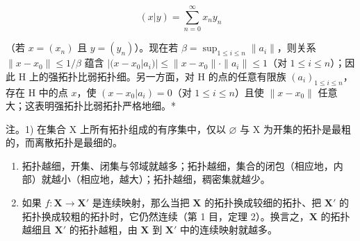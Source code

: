 \[
(x | y) = \sum_ {n = 0} ^ {\infty} x _ {n} y _ {n}
\]

（若 \(x = (x_n)\) 且 \(y = (y_n)\)）。现在若 \(\beta = \sup_{1 \leqslant i \leqslant n} \|a_i\|\)，则关系 \(\|x - x_0\| \leqslant 1/\beta\) 蕴含 \(|(x - x_0|a_i)| \leqslant \|x - x_0\| \cdot \|a_i\| \leqslant 1\)（对 \(1 \leqslant i \leqslant n\)）；因此 H 上的强拓扑比弱拓扑细。另一方面，对 H 的点的任意有限族 \((a_i)_{1 \leqslant i \leqslant n}\)，存在 H 中的点 \(x\)，使 \((x - x_0|a_i) = 0\)（对 \(1 \leqslant i \leqslant n\)）且使 \(\|x - x_0\|\) 任意大；这表明强拓扑比弱拓扑严格地细。*

注。1) 在集合 X 上所有拓扑组成的有序集中，仅以 \(\varnothing\) 与 X 为开集的拓扑是最粗的，而离散拓扑是最细的。

\begin{enumerate}
\def\labelenumi{\arabic{enumi})}
\setcounter{enumi}{1}
\item
  拓扑越细，开集、闭集与邻域就越多；拓扑越细，集合的闭包（相应地，内部）就越小（相应地，越大）；拓扑越细，稠密集就越少。
\item
  如果 \(f: \mathbf{X} \to \mathbf{X}'\) 是连续映射，那么当把 \(\mathbf{X}\) 的拓扑换成较细的拓扑、把 \(\mathbf{X}'\) 的拓扑换成较粗的拓扑时，它仍然连续（第 1 目，定理 2）。换言之，\(\mathbf{X}\) 的拓扑越细且 \(\mathbf{X}'\) 的拓扑越粗，由 \(\mathbf{X}\) 到 \(\mathbf{X}'\) 中的连续映射就越多。
\end{enumerate}

